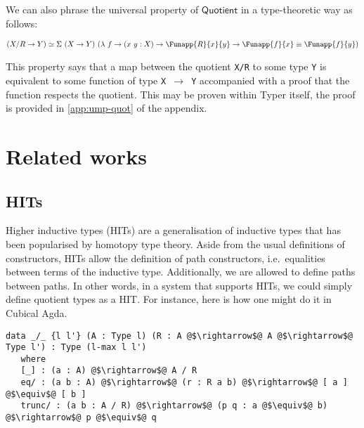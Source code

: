 \documentclass[12pt,twoside,maitrise]{dms}
\theoremstyle{definition}
\numberwithin{equation}{section}
\numberwithin{table}{chapter}
\numberwithin{figure}{chapter}
\newcommand\kw[1] {\textsf{#1}}
\newcommand\id[1] {\texttt{#1}}
\newcommand\fn[1] {\texttt{#1}}
\begin{document}
We can also phrase the universal property of $\kw{Quotient}$ in a type-theoretic
way as follows:

\begin{align*}
  & (X/R \rightarrow Y) \simeq \Sigma \ (X \rightarrow Y) \ (\lambda \ f \rightarrow (x \ y : X) \rightarrow \Funapp{R}{x}{y} \rightarrow \Funapp{f}{x} \equiv \Funapp{f}{y}) \\
\end{align*}

This property says that a map between the quotient \fn{X/R} to some type \id{Y}
is equivalent to some function of type \fn{X $\rightarrow$ Y} accompanied with a
proof that the function respects the quotient. This may be proven within Typer
itself, the proof is provided in \autoref{app:ump-quot} of the appendix.

\chapter{Related works}


\section{HITs}
Higher inductive types (HITs) are a generalisation of inductive types that has
been popularised by homotopy type theory\cite{HoTTbook}. Aside from the usual
definitions of constructors, HITs allow the definition of path constructors,
i.e.\ equalities between terms of the inductive type. Additionally, we are
allowed to define paths between paths. In other words, in a system that supports
HITs, we could simply define quotient types as a HIT. For instance, here is how
one might do it in Cubical Agda.

\begin{verbatim}
data _/_ {l l'} (A : Type l) (R : A @$\rightarrow$@ A @$\rightarrow$@ Type l') : Type (l-max l l')
   where
   [_] : (a : A) @$\rightarrow$@ A / R
   eq/ : (a b : A) @$\rightarrow$@ (r : R a b) @$\rightarrow$@ [ a ] @$\equiv$@ [ b ]
   trunc/ : (a b : A / R) @$\rightarrow$@ (p q : a @$\equiv$@ b) @$\rightarrow$@ p @$\equiv$@ q
\end{verbatim}
\end{document}
